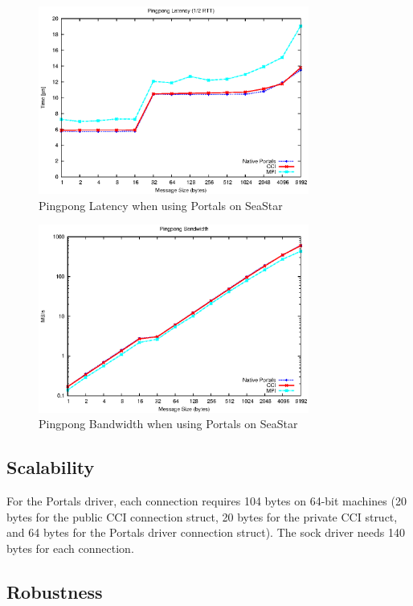 \begin{figure}[htbp]
\centering
\includegraphics[width=3.5in]{pingpong-latency.eps}
\caption{Pingpong Latency when using Portals on SeaStar}
\label{fig:latency}
\end{figure}

\begin{figure}[htbp]
\centering
\includegraphics[width=3.5in]{pingpong-bw.eps}
\caption{Pingpong Bandwidth when using Portals on SeaStar}
\label{fig:bw}
\end{figure}

\subsection{Scalability}

For the Portals driver, each connection requires 104 bytes on 64-bit machines
(20 bytes for the public CCI connection struct, 20 bytes for the private CCI
struct, and 64 bytes for the Portals driver connection struct).  The sock driver
needs 140 bytes for each connection.

\subsection{Robustness}

